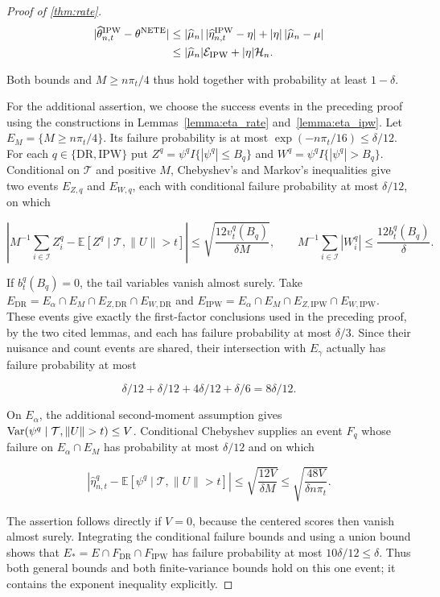 \documentclass[12pt]{article}
\theoremstyle{plain}
\theoremstyle{definition}
\begin{document}
\begin{proof}[Proof of \cref{thm:rate}]
\[
\begin{aligned}
|\widehat\theta_{n,t}^{\mathrm{IPW}}-\theta^{\operatorname{NETE}}|
&\leq|\widehat\mu_n|\,|\widehat\eta_{n,t}^{\mathrm{IPW}}-\eta|+|\eta|\,|\widehat\mu_n-\mu|\\
&\leq|\widehat\mu_n|\mathcal E_{\mathrm{IPW}}+|\eta|\mathcal H_n.
\end{aligned}
\]

Both bounds and $M\geq n\pi_t/4$ thus hold together with probability at least $1-\delta$. 

For the additional assertion, we choose the success events in the preceding proof using the constructions in Lemmas~\ref{lemma:eta_rate} and~\ref{lemma:eta_ipw}. Let $E_M=\{M\geq n\pi_t/4\}$. Its failure probability is at most $\exp(-n\pi_t/16)\leq\delta/12$. For each $q\in\{\mathrm{DR},\mathrm{IPW}\}$ put $Z^q=\psi^q I\{|\psi^q|\leq B_q\}$ and $W^q=\psi^q I\{|\psi^q|>B_q\}$. Conditional on $\mathcal T$ and positive $M$, Chebyshev's and Markov's inequalities give two events $E_{Z,q}$ and $E_{W,q}$, each with conditional failure probability at most $\delta/12$, on which

\[
\left|M^{-1}\sum_{i\in\mathcal I}Z_i^q-\mathbb E[Z^q\mid\mathcal T,\|U\|>t]\right|\leq\sqrt{\frac{12v_t^q(B_q)}{\delta M}},\qquad
M^{-1}\sum_{i\in\mathcal I}|W_i^q|\leq\frac{12b_t^q(B_q)}\delta.
\]

If $b_t^q(B_q)=0$, the tail variables vanish almost surely. Take $E_{\mathrm{DR}}=E_\alpha\cap E_M\cap E_{Z,\mathrm{DR}}\cap E_{W,\mathrm{DR}}$ and $E_{\mathrm{IPW}}=E_\alpha\cap E_M\cap E_{Z,\mathrm{IPW}}\cap E_{W,\mathrm{IPW}}$. These events give exactly the first-factor conclusions used in the preceding proof, by the two cited lemmas, and each has failure probability at most $\delta/3$. Since their nuisance and count events are shared, their intersection with $E_\gamma$ actually has failure probability at most

\[
\delta/12+\delta/12+4\delta/12+\delta/6=8\delta/12.
\]
 

On $E_\alpha$, the additional second-moment assumption gives $\tmop{Var}(\psi^q\mid\mathcal T,\|U\|>t)\leq V$. Conditional Chebyshev supplies an event $F_q$ whose failure on $E_\alpha\cap E_M$ has probability at most $\delta/12$ and on which

\[
\left|\hat\eta_{n,t}^q-\mathbb E[\psi^q\mid\mathcal T,\|U\|>t]\right|\leq\sqrt{\frac{12V}{\delta M}}\leq\sqrt{\frac{48V}{\delta n\pi_t}}.
\]

The assertion follows directly if $V=0$, because the centered scores then vanish almost surely. Integrating the conditional failure bounds and using a union bound shows that $E_*=E\cap F_{\mathrm{DR}}\cap F_{\mathrm{IPW}}$ has failure probability at most $10\delta/12\leq\delta$. Thus both general bounds and both finite-variance bounds hold on this one event; it contains the exponent inequality explicitly. 


\end{proof}
\end{document}
